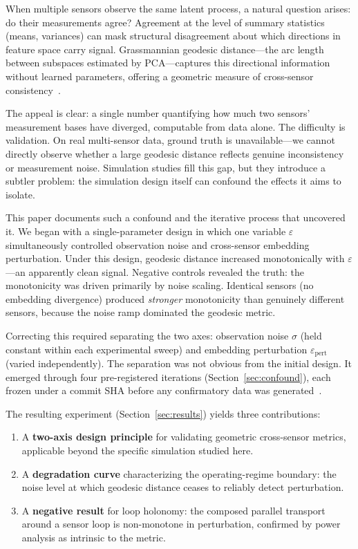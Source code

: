\documentclass[11pt]{article}
\newcommand{\eps}{\varepsilon}
\newcommand{\epspert}{\eps_\mathrm{pert}}
\begin{document}
When multiple sensors observe the same latent process, a natural
question arises: do their measurements agree?  Agreement at the
level of summary statistics (means, variances) can mask structural
disagreement about which directions in feature space carry signal.
Grassmannian geodesic distance---the arc length between subspaces
estimated by PCA---captures this directional information without
learned parameters, offering a geometric measure of cross-sensor
consistency~\citep{edelman1998geometry, chikuse2003statistics}.

The appeal is clear: a single number quantifying how much two
sensors' measurement bases have diverged, computable from data
alone.  The difficulty is validation.  On real multi-sensor data,
ground truth is unavailable---we cannot directly observe whether a
large geodesic distance reflects genuine inconsistency or
measurement noise.  Simulation studies fill this gap, but they
introduce a subtler problem: the simulation design itself can
confound the effects it aims to isolate.

This paper documents such a confound and the iterative process that
uncovered it.  We began with a single-parameter design in which one
variable $\eps$ simultaneously controlled observation noise and
cross-sensor embedding perturbation.  Under this design, geodesic
distance increased monotonically with $\eps$---an apparently clean
signal.  Negative controls revealed the truth: the monotonicity was
driven primarily by noise scaling.  Identical
sensors (no embedding divergence) produced \emph{stronger}
monotonicity than genuinely different sensors, because the noise
ramp dominated the geodesic metric.

Correcting this required separating the two axes: observation noise
$\sigma$ (held constant within each experimental sweep) and
embedding perturbation $\epspert$ (varied independently).  The
separation was not obvious from the initial design.  It emerged
through four pre-registered iterations (Section~\ref{sec:confound}),
each frozen under a commit SHA before any confirmatory data was
generated~\citep{nosek2018preregistration}.

The resulting experiment (Section~\ref{sec:results}) yields three
contributions:

\begin{enumerate}
  \item A \textbf{two-axis design principle} for validating
    geometric cross-sensor metrics, applicable beyond the specific
    simulation studied here.
  \item A \textbf{degradation curve} characterizing the
    operating-regime boundary: the noise level at which geodesic
    distance ceases to reliably detect perturbation.
  \item A \textbf{negative result} for loop holonomy: the composed
    parallel transport around a sensor loop is non-monotone in
    perturbation, confirmed by power analysis as intrinsic to the
    metric.
\end{enumerate}
\end{document}
